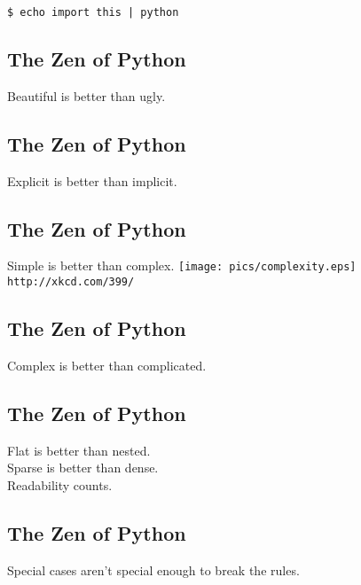 \documentclass[xga]{xdvislides}
\begin{document}
\begin{verbatim}
$ echo import this | python
\end{verbatim}

\subsection{The Zen of Python}
\Huge
\begin{center}
Beautiful is better than ugly.
\end{center}

\subsection{The Zen of Python}
\begin{center}
Explicit is better than implicit.
\end{center}

\subsection{The Zen of Python}
\begin{center}
    Simple is better than complex.
\vspace*{\fill}
	\texttt{[image: pics/complexity.eps]}
	\\
	\small \verb+http://xkcd.com/399/+
\end{center}
\vspace*{\fill}
\Huge

\subsection{The Zen of Python}
\begin{center}
    Complex is better than complicated.
\end{center}

\subsection{The Zen of Python}
\begin{center}
    Flat is better than nested. \\
    Sparse is better than dense. \\
\vspace{.5in}
    Readability counts.
\end{center}

\subsection{The Zen of Python}
\begin{center}
    Special cases aren't special enough to break the rules.
\end{center}
\end{document}
